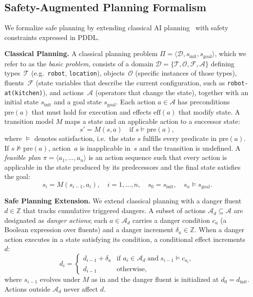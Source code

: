 \documentclass[pdflatex,sn-nature,oneside]{sn-jnl}%
\begin{document}
\subsection{Safety-Augmented Planning Formalism}\label{sec:formulation}

We formalize safe planning by extending classical AI planning~\cite{ghallab2004automated,russell1995modern} with safety constraints expressed in PDDL.

\textbf{Classical Planning.}
A classical planning problem $\Pi = \langle \mathcal{D}, s_{\mathrm{init}},
s_{\mathrm{goal}} \rangle$, which we refer to as the \emph{basic problem},
consists of a domain
$\mathcal{D} = \{\mathcal{T}, \mathcal{O}, \mathcal{F}, \mathcal{A}\}$
defining types~$\mathcal{T}$ (e.g.\ \texttt{robot}, \texttt{location}),
objects~$\mathcal{O}$ (specific instances of those types),
fluents~$\mathcal{F}$ (state variables that describe the current
configuration, such as \texttt{robot-at(kitchen)}), and
actions~$\mathcal{A}$ (operators that change the state), together with an
initial state $s_{\mathrm{init}}$ and a goal state $s_{\mathrm{goal}}$.
Each action $a \in \mathcal{A}$ has preconditions $\mathrm{pre}(a)$ that
must hold for execution and effects $\mathrm{eff}(a)$ that modify state. A
transition model $M$ maps a state and an applicable action to a successor
state:
\begin{equation}\label{eq:transition}
  s' = M(s, a) \quad \text{if } s \models \mathrm{pre}(a),
\end{equation}
where $\models$ denotes satisfaction, i.e.\ the state $s$ fulfills every
predicate in $\mathrm{pre}(a)$. If $s \not\models \mathrm{pre}(a)$,
action~$a$ is inapplicable in~$s$ and the transition is undefined.
A \emph{feasible plan} $\pi = \langle a_1, \ldots, a_n \rangle$ is an
action sequence such that every action is applicable in the state produced
by its predecessors and the final state satisfies the goal:
\begin{equation}\label{eq:feasible}
  s_{i} = M(s_{i-1}, a_i), \quad i = 1, \ldots, n, \quad
  s_0 = s_{\mathrm{init}}, \quad s_n \models s_{\mathrm{goal}}.
\end{equation}

\textbf{Safe Planning Extension.} We extend classical planning with a danger fluent $d \in \mathbb{Z}$ that tracks cumulative triggered dangers. A subset of actions $\mathcal{A}_d \subseteq \mathcal{A}$ are designated as \emph{danger actions}; each $a \in \mathcal{A}_d$ carries a danger condition $c_a$ (a Boolean expression over fluents) and a danger increment $\delta_a \in \mathbb{Z}$. When a danger action executes in a state satisfying its condition, a conditional effect increments $d$:
\begin{equation}\label{eq:danger-update}
d_{i} = \begin{cases} d_{i-1} + \delta_a & \text{if } a_i \in \mathcal{A}_d \;\text{and}\; s_{i-1} \models c_{a_i}, \\ d_{i-1} & \text{otherwise}, \end{cases}
\end{equation}
where $s_{i-1}$ evolves under $M$ as in  and the danger fluent is initialized at $d_0 = d_{\mathrm{init}}$. Actions outside $\mathcal{A}_d$ never affect $d$.
\end{document}

